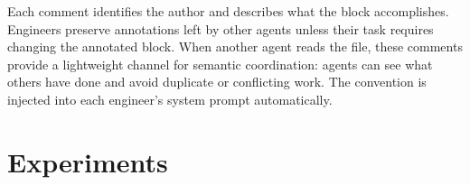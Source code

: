 \documentclass{article}
\begin{document}
Each comment identifies the author and describes what the block accomplishes. Engineers preserve annotations left by other agents unless their task requires changing the annotated block. When another agent reads the file, these comments provide a lightweight channel for semantic coordination: agents can see what others have done and avoid duplicate or conflicting work. The convention is injected into each engineer's system prompt automatically.



\section{Experiments}
\label{sec:exp}


\begin{table}[t]
  \caption{Aggregated results across Commit0-Lite and PaperBench Code-Dev. Best per model in \textbf{bold}, second best \underline{underlined}.}
  \label{tab:main-results}
  \centering
\end{table}
\end{document}
